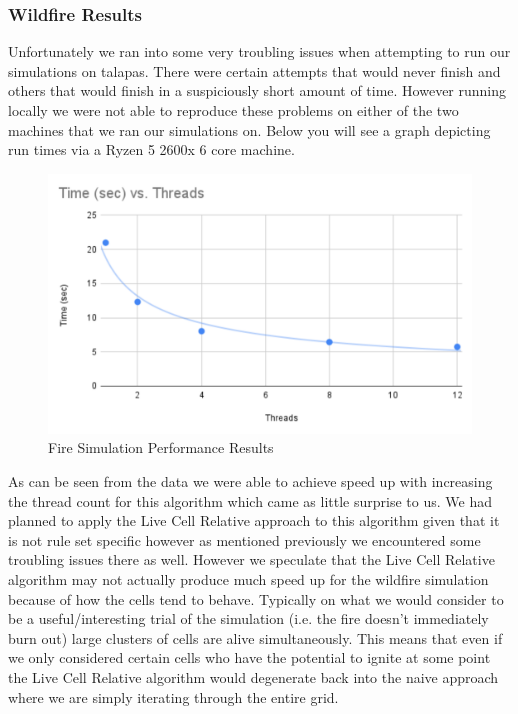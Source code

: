 \documentclass[12pt]{article}
\begin{document}
\subsubsection{Wildfire Results}
Unfortunately we ran into some very troubling issues when attempting to run our simulations on talapas. There were certain attempts that would never finish and others that would finish in a suspiciously short amount of time. However running locally we were not able to reproduce these problems on either of the two machines that we ran our simulations on. Below you will see a graph depicting run times via a Ryzen 5 2600x 6 core machine.
\begin{figure}[!ht]
    \centering
    \includegraphics[width=\linewidth]{FireSimResGraph.PNG}
    \caption{Fire Simulation Performance Results}
    \label{fig:fireR}
\end{figure}
\par
As can be seen from the data we were able to achieve speed up with increasing the thread count for this algorithm which came as little surprise to us. We had planned to apply the Live Cell Relative approach to this algorithm given that it is not rule set specific however as mentioned previously we encountered some troubling issues there as well. However we speculate that the Live Cell Relative algorithm may not actually produce much speed up for the wildfire simulation because of how the cells tend to behave. Typically on what we would consider to be a useful/interesting trial of the simulation (i.e. the fire doesn't immediately burn out) large clusters of cells are alive simultaneously. This means that even if we only considered certain cells who have the potential to ignite at some point the Live Cell Relative algorithm would degenerate back into the naive approach where we are simply iterating through the entire grid.
\\
\end{document}
